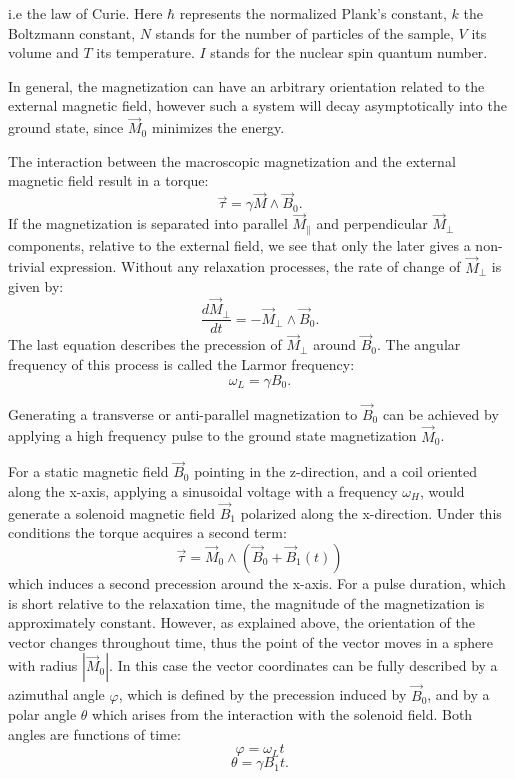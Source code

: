 i.e the law of Curie. Here $\hbar$ represents the normalized Plank's constant, $k$ the Boltzmann constant, $N$ stands for the number of particles of the sample, $V$ its volume and $T$ its temperature. $I$ stands for the nuclear spin quantum number. 


In general, the magnetization can have an arbitrary orientation related to the external magnetic field, however such a system will decay asymptotically into the ground state, since $\vec{M}_0$ minimizes the energy. 

The interaction between the macroscopic magnetization and the external magnetic field result in a torque:
\begin{equation}
\vec{\tau} = \gamma\vec{M} \wedge\vec{B}_0.
\end{equation}
If the magnetization is separated into parallel $\vec{M}_{\parallel}$ and perpendicular $\vec{M}_{\perp}$ components, relative to the external field, we  see that only the later gives a non-trivial expression. Without any relaxation processes, the rate of change of $\vec{M}_\perp$ is given by:
\begin{equation}
\frac{d \vec{M}_{\perp}}{dt} = -\vec{M}_{\perp}\wedge\vec{B}_0.
\end{equation}
The last equation describes the precession of $\vec{M}_{\perp}$ around $\vec{B}_0$. The angular frequency of this process is called the Larmor frequency:
\begin{equation}
\label{eq: larmor freq}
\omega_L = \gamma B_0.
\end{equation}

Generating a transverse or anti-parallel magnetization to $\vec{B}_0$ can be achieved by applying a high frequency pulse to the ground state magnetization $\vec{M}_0$. 

For a static magnetic field $\vec{B}_0$ pointing in the z-direction, and a coil oriented along the x-axis, applying a sinusoidal voltage with a frequency $\omega_H$, would generate a solenoid magnetic field $\vec{B}_1$ polarized along the x-direction. Under this conditions the torque  acquires a second term:
\begin{equation}
\vec{\tau} = \vec{M}_0\wedge\left(\vec{B}_0 + \vec{B}_1(t)\right)
\end{equation}
which induces a second precession around the x-axis.
For a pulse duration, which is short relative to the relaxation time, the magnitude of the magnetization is approximately constant. 
However, as explained above, the orientation of the vector changes throughout time, thus the point of the vector moves in a sphere with radius $|\vec{M}_0|$. In this case the vector coordinates can be fully described by a azimuthal angle $\varphi$, which is defined by the precession induced by $\vec{B}_0$, and by a polar angle $\theta$ which arises from the interaction with the solenoid field. Both angles are functions of time:
\begin{equation}
\varphi = \omega_L t
\end{equation}
\begin{equation}
\theta = \gamma B_1 t.
\end{equation}

